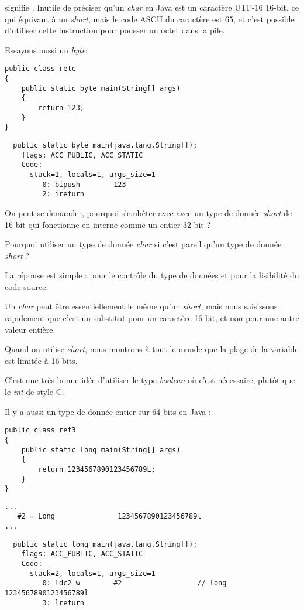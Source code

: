  signifie .
Inutile de préciser qu'un \emph{char} en Java est un caractère UTF-16 16-bit,
ce qui équivaut à un \emph{short}, mais le code ASCII du caractère  est 65, et c'est possible
d'utiliser cette instruction pour pousser un octet dans la pile.

Essayons aussi un \emph{byte}:

\begin{lstlisting}[style=customjava]
public class retc
{
	public static byte main(String[] args)
	{
		return 123;
	}
}
\end{lstlisting}

\begin{lstlisting}
  public static byte main(java.lang.String[]);
    flags: ACC_PUBLIC, ACC_STATIC
    Code:
      stack=1, locals=1, args_size=1
         0: bipush        123
         2: ireturn
\end{lstlisting}

On peut se demander, pourquoi s'embêter avec avec un type de donnée \emph{short} de 16-bit qui fonctionne en interne
comme un entier 32-bit ?

Pourquoi utiliser un type de donnée \emph{char} si c'est pareil qu'un type de donnée \emph{short} ?

La réponse est simple : pour le contrôle du type de données et pour la lisibilité du code source.

Un \emph{char} peut être essentiellement le même qu'un \emph{short}, mais nous saisissons rapidement que c'est un substitut pour
un caractère 16-bit, et non pour une autre valeur entière.

Quand on utilise \emph{short}, nous montrons à tout le monde que la plage de la variable est limitée à 16 bits.

C'est une très bonne idée d'utiliser le type \emph{boolean} où c'est nécessaire,
plutôt que le \emph{int} de style C.

Il y a aussi un type de donnée entier sur 64-bits en Java :

\begin{lstlisting}[style=customjava]
public class ret3
{
	public static long main(String[] args)
	{
		return 1234567890123456789L;
	}
}
\end{lstlisting}

\begin{lstlisting}[caption=Constant pool]
...
   #2 = Long               1234567890123456789l
...
\end{lstlisting}

\begin{lstlisting}
  public static long main(java.lang.String[]);
    flags: ACC_PUBLIC, ACC_STATIC
    Code:
      stack=2, locals=1, args_size=1
         0: ldc2_w        #2                  // long 1234567890123456789l
         3: lreturn
\end{lstlisting}


